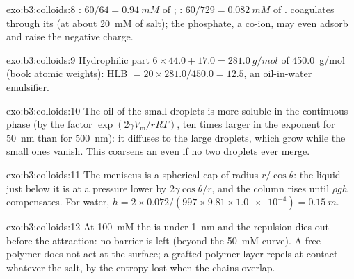 \begin{solution}{exo:b3:colloids:8}
: $60/64 = \qty{0.94}{mM}$ of ; : $60/729 = \qty{0.082}{mM}$ of . 
coagulates through its  (at about \qty{20}{mM} of salt); the phosphate, a
co-ion, may even adsorb and raise the negative charge.
\end{solution}

\begin{solution}{exo:b3:colloids:9}
Hydrophilic part $6 \times 44.0 + 17.0 = \qty{281.0}{g/mol}$ of \qty{450.0}{g/mol} (book atomic weights):
HLB $= 20 \times 281.0/450.0 = 12.5$, an oil-in-water emulsifier.
\end{solution}

\begin{solution}{exo:b3:colloids:10}
The oil of the small droplets is more soluble in the continuous phase (by the
factor $\exp(2\gamma V_{\mathrm m}/rRT)$, ten times larger in the exponent for \qty{50}{nm} than for \qty{500}{nm}): it
diffuses to the large droplets, which grow while the small ones vanish. This
 coarsens an  even if no two droplets ever merge.
\end{solution}

\begin{solution}{exo:b3:colloids:11}
The meniscus is a spherical cap of radius $r/\cos\theta$: the liquid just below it is at a
pressure lower by $2\gamma\cos\theta/r$, and the column rises until $\rho gh$ compensates. For water,
$h = 2 \times 0.072/(997 \times 9.81 \times \num{1.0e-4}) = \qty{0.15}{m}$.
\end{solution}

\begin{solution}{exo:b3:colloids:12}
At \qty{100}{mM} the  is under \qty{1}{nm} and the repulsion dies out before the
attraction: no barrier is left (beyond the \qty{50}{mM} curve). A free polymer does not
act at the surface; a grafted polymer layer repels at contact whatever the
salt, by the entropy lost when the chains overlap.
\end{solution}

